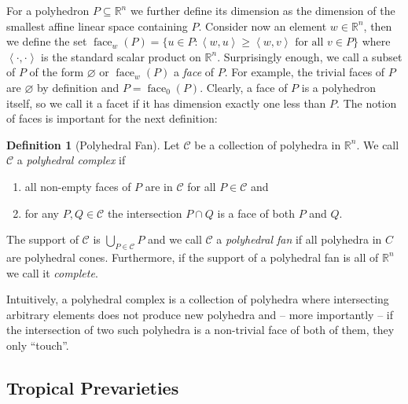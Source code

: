 \documentclass[
  paper=a4,
  DIV=14,
  fontsize=12pt,
  titlepage,
  bibliography=totoc,
  listof=totoc,
  pagesize=pdftex
]{scrartcl}
\numberwithin{figure}{section}
\numberwithin{equation}{section}
\numberwithin{table}{section}
\newcommand*\setR{\mathds{R}}
\newcommand*\ideal[1]{\left\langle #1 \right\rangle}
\DeclareMathOperator{\face}{face}
\theoremstyle{definition}
\newtheorem{definition}{Definition}
\numberwithin{definition}{section}
\begin{document}
For a polyhedron $P \subseteq \setR^n$ we further define its dimension as the dimension of
the smallest affine linear space containing $P$. Consider now an element $w \in \setR^n$,
then we define the set $\face_w(P) = \{ u \in P : \ideal{w,u} \geq \ideal{w,v} \text{ for
all } v\in P\}$ where $\ideal{\cdot,\cdot}$ is the standard scalar product on $\setR^n$.
Surprisingly enough, we call a subset of $P$ of the form $\varnothing$ or $\face_w(P)$ a
\emph{face} of $P$. For example, the trivial faces of $P$ are $\varnothing$ by definition
and $P = \face_0(P)$. Clearly, a face of $P$ is a polyhedron itself, so we call it a facet
if it has dimension exactly one less than $P$. The notion of faces is important for the
next definition:

\begin{definition}[Polyhedral Fan]
  Let $\mathcal C$ be a collection of polyhedra in $\setR^n$. We call $\mathcal C$ a
  \emph{polyhedral complex} if
  \begin{enumerate}
    \item all non-empty faces of $P$ are in $\mathcal C$ for all $P \in \mathcal C$ and
    \item for any $P,Q \in \mathcal C$ the intersection $P\cap Q$ is a face of both $P$
      and $Q$.
  \end{enumerate}
  The support of $\mathcal C$ is $\bigcup_{P\in\mathcal C}P$ and we call $\mathcal C$ a
  \emph{polyhedral fan} if all polyhedra in $C$ are polyhedral cones. Furthermore, if the
  support of a polyhedral fan is all of $\setR^n$ we call it \emph{complete}.
  \label{def:polyhedralFan}
\end{definition}

Intuitively, a polyhedral complex is a collection of polyhedra where intersecting
arbitrary elements does not produce new polyhedra and -- more importantly -- if the
intersection of two such polyhedra is a non-trivial face of both of them, they only
\enquote{touch}.


\subsection{Tropical Prevarieties}
\end{document}
